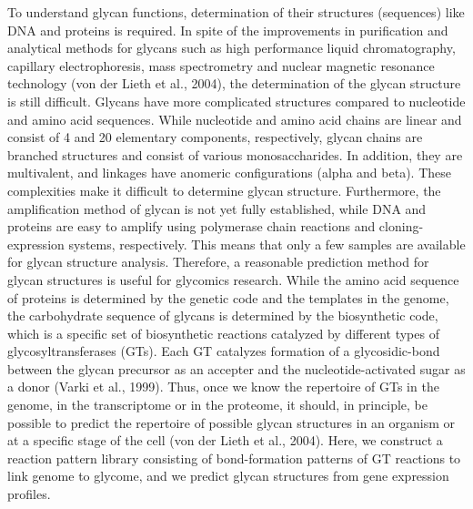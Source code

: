 \documentclass[12pt,a4paper]{article}
\begin{document}
To understand glycan functions, determination of their structures (sequences) like DNA and proteins is required. In spite of the improvements in purification and analytical methods for glycans such as high performance liquid chromatography, capillary electrophoresis, mass spectrometry and nuclear magnetic resonance technology (von der Lieth et al., 2004), the determination of the glycan structure is still difficult. Glycans have more complicated structures compared to nucleotide and amino acid sequences. While nucleotide and amino acid chains are linear and consist of 4 and 20 elementary components, respectively, glycan chains are branched structures and consist of various monosaccharides. In addition, they are multivalent, and linkages have anomeric configurations (alpha and beta). These complexities make it difficult to determine glycan structure. Furthermore, the amplification method of glycan is not yet fully established, while DNA and proteins are easy to amplify using polymerase chain reactions and cloning-expression systems, respectively. This means that only a few samples are available for glycan structure analysis. Therefore, a reasonable prediction method for glycan structures is useful for glycomics research. While the amino acid sequence of proteins is determined by the genetic code and the templates in the genome, the carbohydrate sequence of glycans is determined by the biosynthetic code, which is a specific set of biosynthetic reactions catalyzed by different types of glycosyltransferases (GTs). Each GT catalyzes formation of a glycosidic-bond between the glycan precursor as an accepter and the nucleotide-activated sugar as a donor (Varki et al., 1999). Thus, once we know the repertoire of GTs in the genome, in the transcriptome or in the proteome, it should, in principle, be possible to predict the repertoire of possible glycan structures in an organism or at a specific stage of the cell (von der Lieth et al., 2004). Here, we construct a reaction pattern library consisting of bond-formation patterns of GT reactions to link genome to glycome, and we predict glycan structures from gene expression profiles.
\end{document}
